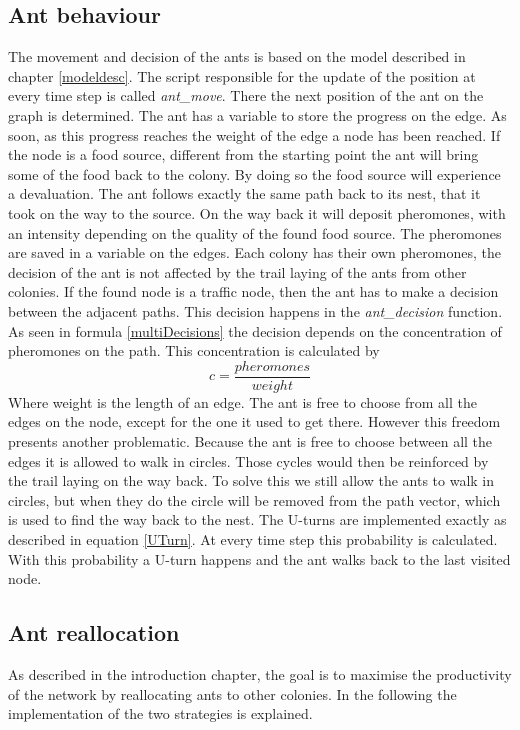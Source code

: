 \subsection{Ant behaviour}
The movement and decision of the ants is based on the model described in chapter \ref{modeldesc}. The script responsible for the update of the position at every time step is called \textit{ant\_move}. There the next position of the ant on the graph is determined. The ant has a variable to store the progress on the edge. As soon, as this progress reaches the weight of the edge a node has been reached. If the node is a food source, different from the starting point the ant will bring some of the food back to the colony. By doing so the food source will experience a devaluation. The ant follows exactly the same path back to its nest, that it took on the way to the source. On the way back it will deposit pheromones, with an intensity depending on the quality of the found food source. The pheromones are saved in a variable on the edges. Each colony has their own pheromones, the decision of the ant is not affected by the trail laying of the ants from other colonies.
If the found node is a traffic node, then the ant has to make a decision between the adjacent paths. This decision happens in the \textit{ant\_decision} function. As seen in formula \ref{multiDecisions} the decision depends on the concentration of pheromones on the path. This concentration is calculated by
\begin{equation}
c = \frac{pheromones}{weight}
\end{equation}
Where weight is the length of an edge. The ant is free to choose from all the edges on the node, except for the one it used to get there.
However this freedom presents another problematic. Because the ant is free to choose between all the edges it is allowed to walk in circles. Those cycles would then be reinforced by the trail laying on the way back. To solve this we still allow the ants to walk in circles, but when they do the circle will be removed from the path vector, which is used to find the way back to the nest.
The U-turns are implemented exactly as described in equation \ref{UTurn}. At every time step this probability is calculated. With this probability a U-turn happens and the ant walks back to the last visited node. 
\subsection{Ant reallocation}
As described in the introduction chapter, the goal is to maximise the productivity of the network by reallocating ants to other colonies. In the following the implementation of the two strategies is explained.
